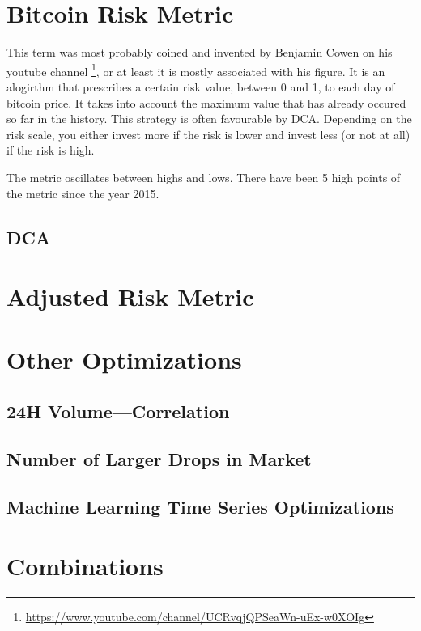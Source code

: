\section{Bitcoin Risk Metric}
This term was most probably coined and invented by Benjamin Cowen on his youtube channel \footnote{\url{https://www.youtube.com/channel/UCRvqjQPSeaWn-uEx-w0XOIg}}, or at least it is mostly associated with his figure. It is an alogirthm that prescribes a certain risk value, between 0 and 1, to each day of bitcoin price. It takes into account the maximum value that has already occured so far in the history. This strategy is often favourable by DCA. Depending on the risk scale, you either invest more if the risk is lower and invest less (or not at all) if the risk is high.

The metric oscillates between highs and lows. There have been 5 high points of the metric since the year 2015.

\subsection*{DCA}
\label{DCA}

\section{Adjusted Risk Metric}

\section{Other Optimizations}

\subsection*{24H Volume---Correlation}

\subsection*{Number of Larger Drops in Market}

\subsection*{Machine Learning Time Series Optimizations}

\section{Combinations}


